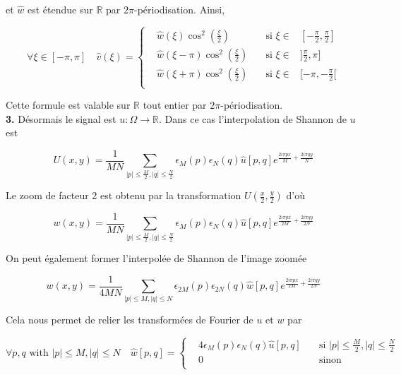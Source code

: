 \documentclass[a4paper, 11pt]{article}
\begin{document}
et $\hat{w}$ est étendue sur $\mathbb{R}$ par $2\pi$-périodisation. Ainsi,


$$\boxed{ \forall \xi \in [-\pi, \pi]  \quad  \hat{v}(\xi)=\left\lbrace
\begin{array}{llll}
  &\hat{w}(\xi) \cos^2(\frac{\xi}{2}) \quad &\text{si } \xi \in &[-\frac{\pi}{2}, \frac{\pi}{2}] \\
  &\hat{w}(\xi-\pi) \cos^2(\frac{\xi}{2})  \quad &\text{si } \xi \in &]\frac{\pi}{2}, \pi] \\
  &\hat{w}(\xi+\pi) \cos^2(\frac{\xi}{2}) \quad &\text{si } \xi \in &[-\pi, -\frac{\pi}{2}[ \\
\end{array}
\right.}$$

Cette formule est valable sur $\mathbb{R}$ tout entier par $2\pi$-périodisation. \\

\textbf{3.} Désormais le signal est $u: \Omega \to \mathbb{R}$. Dans ce cas l'interpolation de Shannon de $u$ est 

\begin{equation}
  U(x,y) = \frac{1}{MN} \sum_{|p| \leq \frac{M}{2}, |q| \leq \frac{N}{2}} \epsilon_M(p) \epsilon_N(q) \hat{u}[p,q]
  e^{\frac{2i\pi px}{M} + \frac{2i\pi qy}{N}}
\end{equation}

Le zoom de facteur 2 est obtenu par la transformation $U(\frac{x}{2}, \frac{y}{2})$ d'où

\begin{equation*}
  w(x,y) = \frac{1}{MN} \sum_{|p| \leq \frac{M}{2}, |q| \leq \frac{N}{2}} \epsilon_M(p) \epsilon_N(q) \hat{u}[p,q]
  e^{\frac{2i\pi px}{2M} + \frac{2i\pi qy}{2N}}
\end{equation*}

On peut également former l'interpolée de Shannon de l'image zoomée

\begin{equation*}
  w(x,y) = \frac{1}{4MN} \sum_{|p| \leq M, |q| \leq N} \epsilon_{2M}(p) \epsilon_{2N}(q) \hat{w}[p,q]
  e^{\frac{2i\pi px}{2M} + \frac{2i\pi qy}{2N}}
\end{equation*}

\clearpage

Cela nous permet de relier les transformées de Fourier de $u$ et $w$ par

$$\boxed{ \forall p,q \text{ with } |p| \leq M, |q| \leq N \quad  \hat{w}[p,q]=\left\lbrace
\begin{array}{lll}
  &4 \epsilon_M(p) \epsilon_N(q) \hat{u}[p,q] \quad &\text{si } |p| \leq \frac{M}{2}, |q| \leq \frac{N}{2}\\
  &0  \quad &\text{sinon}\\
\end{array}
\right.}$$
\end{document}
